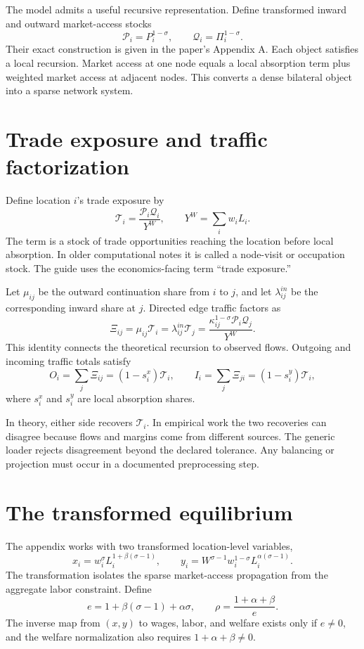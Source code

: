 The model admits a useful recursive representation. Define transformed inward
and outward market-access stocks
\[
  \mathcal P_i=P_i^{1-\sigma},
  \qquad
  \mathcal Q_i=\Pi_i^{1-\sigma}.
\]
Their exact construction is given in the paper's Appendix A. Each object
satisfies a local recursion. Market access at one node equals a local absorption
term plus weighted market access at adjacent nodes. This converts a dense
bilateral object into a sparse network system.

\section{Trade exposure and traffic factorization}

Define location \(i\)'s trade exposure by
\[
  \mathcal T_i=\frac{\mathcal P_i\mathcal Q_i}{Y^W},
  \qquad
  Y^W=\sum_i w_iL_i.
\]
The term is a stock of trade opportunities reaching the location before local
absorption. In older computational notes it is called a node-visit or
occupation stock. The guide uses the economics-facing term ``trade exposure.''

Let \(\mu_{ij}\) be the outward continuation share from \(i\) to \(j\), and
let \(\lambda^{in}_{ij}\) be the corresponding inward share at \(j\). Directed
edge traffic factors as
\[
  \Xi_{ij}=\mu_{ij}\mathcal T_i
          =\lambda^{in}_{ij}\mathcal T_j
          =\frac{\kappa_{ij}^{1-\sigma}
                  \mathcal P_i\mathcal Q_j}{Y^W}.
\]
This identity connects the theoretical recursion to observed flows. Outgoing
and incoming traffic totals satisfy
\[
 O_i=\sum_j\Xi_{ij}=(1-s_i^x)\mathcal T_i,
 \qquad
 I_i=\sum_j\Xi_{ji}=(1-s_i^y)\mathcal T_i,
\]
where \(s_i^x\) and \(s_i^y\) are local absorption shares.

In theory, either side recovers \(\mathcal T_i\). In empirical work the two
recoveries can disagree because flows and margins come from different
sources. The generic loader rejects disagreement beyond the declared
tolerance. Any balancing or projection must occur in a documented
preprocessing step.

\section{The transformed equilibrium}

The appendix works with two transformed location-level variables,
\[
 x_i=w_i^\sigma L_i^{1+\beta(\sigma-1)},\qquad
 y_i=W^{\sigma-1}w_i^{1-\sigma}L_i^{\alpha(\sigma-1)}.
\]
The transformation isolates the sparse market-access propagation from the
aggregate labor constraint. Define
\[
 e=1+\beta(\sigma-1)+\alpha\sigma,
 \qquad
 \rho=\frac{1+\alpha+\beta}{e}.
\]
The inverse map from \((x,y)\) to wages, labor, and welfare exists only if
\(e\neq0\), and the welfare normalization also requires
\(1+\alpha+\beta\neq0\).

